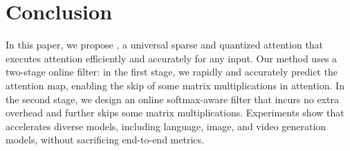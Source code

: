 \section{Conclusion}  %

In this paper, we propose \our, a universal sparse and quantized attention that executes attention efficiently and accurately for any input. Our method uses a two-stage online filter: in the first stage, we rapidly and accurately predict the attention map, enabling the skip of some matrix multiplications in attention. In the second stage, we design an online softmax-aware filter that incurs no extra overhead and further skips some matrix multiplications. Experiments show that \our accelerates diverse models, including language, image, and video generation models, without sacrificing end-to-end metrics.

